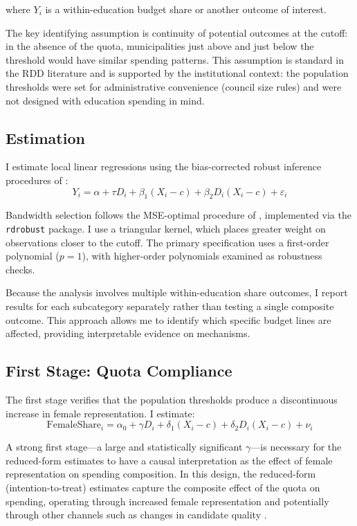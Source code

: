 \documentclass[12pt]{article}
\begin{document}
where $Y_i$ is a within-education budget share or another outcome of interest.

The key identifying assumption is continuity of potential outcomes at the cutoff: in the absence of the quota, municipalities just above and just below the threshold would have similar spending patterns. This assumption is standard in the RDD literature \citep{imbens2008regression, lee2010regression} and is supported by the institutional context: the population thresholds were set for administrative convenience (council size rules) and were not designed with education spending in mind.

\subsection{Estimation}

I estimate local linear regressions using the bias-corrected robust inference procedures of \citet{calonico2014robust}:
\begin{equation}
    Y_i = \alpha + \tau D_i + \beta_1 (X_i - c) + \beta_2 D_i (X_i - c) + \varepsilon_i
\end{equation}

Bandwidth selection follows the MSE-optimal procedure of \citet{calonico2014robust}, implemented via the \texttt{rdrobust} package. I use a triangular kernel, which places greater weight on observations closer to the cutoff. The primary specification uses a first-order polynomial ($p = 1$), with higher-order polynomials examined as robustness checks.

Because the analysis involves multiple within-education share outcomes, I report results for each subcategory separately rather than testing a single composite outcome. This approach allows me to identify which specific budget lines are affected, providing interpretable evidence on mechanisms.

\subsection{First Stage: Quota Compliance}

The first stage verifies that the population thresholds produce a discontinuous increase in female representation. I estimate:
\begin{equation}
    \text{FemaleShare}_i = \alpha_0 + \gamma D_i + \delta_1 (X_i - c) + \delta_2 D_i (X_i - c) + \nu_i
\end{equation}

A strong first stage---a large and statistically significant $\gamma$---is necessary for the reduced-form estimates to have a causal interpretation as the effect of female representation on spending composition. In this design, the reduced-form (intention-to-treat) estimates capture the composite effect of the quota on spending, operating through increased female representation and potentially through other channels such as changes in candidate quality \citep{baltrunaite2014quotas}.
\end{document}
